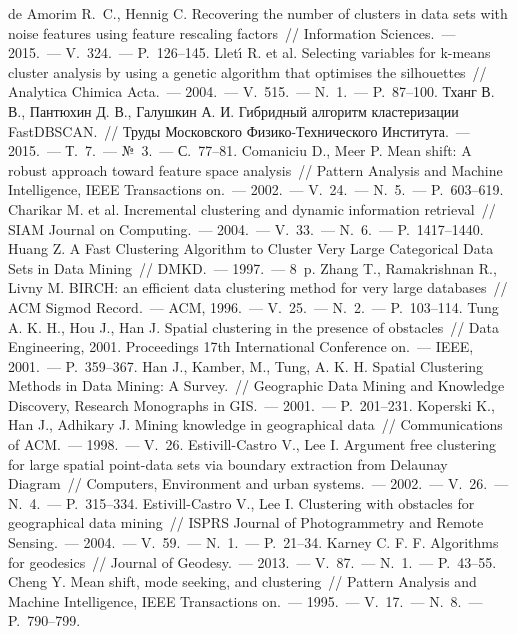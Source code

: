 \begin{thebibliography}{99}
     de Amorim R.~C., Hennig C. Recovering the number of clusters in data sets with noise features using feature rescaling factors~// Information Sciences.~--- 2015.~--- V.~324.~--- P.~126--145.
     Llet\'{\i} R. et al. Selecting variables for k-means cluster analysis by using a genetic algorithm that optimises the silhouettes~// Analytica Chimica Acta.~--- 2004.~--- V.~515.~--- N.~1.~--- P.~87--100.
     Тханг В. В., Пантюхин Д. В., Галушкин А. И. Гибридный алгоритм кластеризации FastDBSCAN.~// Труды Московского Физико-Технического Института.~--- 2015.~--- Т.~7.~--- №~3.~--- С.~77--81.
     Comaniciu D., Meer P. Mean shift: A robust approach toward feature space analysis~// Pattern Analysis and Machine Intelligence, IEEE Transactions on.~--- 2002.~--- V.~24.~--- N.~5.~--- P.~603--619.
     Charikar M. et al. Incremental clustering and dynamic information retrieval~// SIAM Journal on Computing.~--- 2004.~--- V.~33.~--- N.~6.~--- P.~1417--1440.
     Huang Z. A Fast Clustering Algorithm to Cluster Very Large Categorical Data Sets in Data Mining~// DMKD.~--- 1997.~--- 8~p.
     Zhang T., Ramakrishnan R., Livny M. BIRCH: an efficient data clustering method for very large databases~// ACM Sigmod Record.~--- ACM, 1996.~--- V.~25.~--- N.~2.~--- P.~103--114.
     Tung A. K. H., Hou J., Han J. Spatial clustering in the presence of obstacles~// Data Engineering, 2001. Proceedings 17th International Conference on.~--- IEEE, 2001.~--- P.~359--367.
     Han J., Kamber, M., Tung, A. K. H. Spatial Clustering Methods in Data Mining: A Survey.~// Geographic Data Mining and Knowledge Discovery, Research Monographs in GIS.~--- 2001.~--- P.~201--231.
     Koperski K., Han J., Adhikary J. Mining knowledge in geographical data~// Communications of ACM.~--- 1998.~--- V.~26.
     Estivill-Castro V., Lee I. Argument free clustering for large spatial point-data sets via boundary extraction from Delaunay Diagram~// Computers, Environment and urban systems.~--- 2002.~--- V.~26.~--- N.~4.~--- P.~315--334.
     Estivill-Castro V., Lee I. Clustering with obstacles for geographical data mining~// ISPRS Journal of Photogrammetry and Remote Sensing.~--- 2004.~--- V.~59.~--- N.~1.~--- P.~21--34.
     Karney C. F. F. Algorithms for geodesics~// Journal of Geodesy.~--- 2013.~--- V.~87.~--- N.~1.~--- P.~43--55.
     Cheng Y. Mean shift, mode seeking, and clustering~// Pattern Analysis and Machine Intelligence, IEEE Transactions on.~--- 1995.~--- V.~17.~--- N.~8.~--- P.~790--799.

\end{thebibliography}
